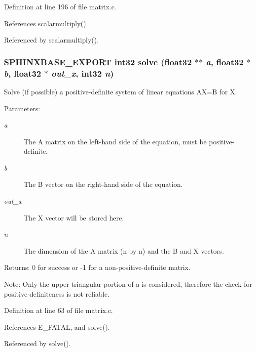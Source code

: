 Definition at line 196 of file matrix.c.

References scalarmultiply().

Referenced by scalarmultiply().
\subsubsection[{solve}]{\setlength{\rightskip}{0pt plus 5cm}SPHINXBASE\_\-EXPORT int32 solve (float32 $\ast$$\ast$ {\em a}, \/  float32 $\ast$ {\em b}, \/  float32 $\ast$ {\em out\_\-x}, \/  int32 {\em n})}\label{matrix_8h_174a82dac39a15828af6c87edcba3708}


Solve (if possible) a positive-definite system of linear equations AX=B for X. 

\begin{Desc}
\item[Parameters:]
\begin{description}
\item[{\em a}]The A matrix on the left-hand side of the equation, must be positive-definite. \item[{\em b}]The B vector on the right-hand side of the equation. \item[{\em out\_\-x}]The X vector will be stored here. \item[{\em n}]The dimension of the A matrix (n by n) and the B and X vectors. \end{description}
\end{Desc}
\begin{Desc}
\item[Returns:]0 for success or -1 for a non-positive-definite matrix.\end{Desc}
\begin{Desc}
\item[Note:]Only the upper triangular portion of a is considered, therefore the check for positive-definiteness is not reliable. \end{Desc}


Definition at line 63 of file matrix.c.

References E\_\-FATAL, and solve().

Referenced by solve().